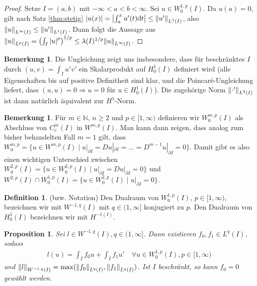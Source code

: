 \documentclass[twoside]{article}
\newtheorem{proposition}[theorem]{Proposition}
\theoremstyle{definition}
\newtheorem{remark}[theorem]{Bemerkung}
\newtheorem{definition}[theorem]{Definition}
\begin{document}
\begin{proof}
Setze $I = (a,b)$ mit $-\infty < a < b < \infty$. Sei $u \in W^{1,p}_0(I)$. Da $u(a) = 0$, gilt nach Satz \ref{thm:stetig} $\abs{u(x)} = \abs{\int_a^x u'(t) \mathrm{d}t}\leq \norm{u'}_{L^1(I)}$, also $\norm{u}_{L^\infty(I)} \leq \norm{u'}_{L^1(I)}$. Dann folgt die Aussage aus $\norm{u}_{L^p(I)} = \left(\int_I \abs{u}^p \right)^{1/p} \leq \lambda(I)^{1/p} \norm{u}_{L^\infty(I)}$.
\end{proof}
\begin{remark}
Die Ungleichung zeigt uns insbesondere, dass für beschränktes $I$ durch $(u,v)= \int_I u'v'$ ein Skalarprodukt auf $H^1_0(I)$ definiert wird (alle Eigenschaften bis auf positive Definitheit sind klar, und die Poincar{\'e}-Ungleichung liefert, dass $(u,u)=0 \Rightarrow u = 0$ für $u \in H^1_0(I)$). Die zugehörige Norm $\norm{\cdot'}_{L^2(I)}$ ist dann natürlich äquivalent zur $H^1$-Norm.
\end{remark}
\begin{remark}
Für $m \in \mathbb{N}$, $n \geq 2$ und $p \in [1,\infty)$ definieren wir $W^{m,p}_0(I)$ als Abschluss von $C_c^m(I)$ in $W^{m,p}(I)$. Man kann dann zeigen, dass analog zum bisher behandelten Fall $m=1$ gilt, dass $W_0^{m,p}= \{u \in W^{m,p}(I)  \; | \; u|_{\partial I} = D u|_{\partial I} = \dots = D^{m-1}u|_{\partial I} = 0\}$. Damit gibt es also einen wichtigen Unterschied zwischen $W^{2,p}_0(I)=\{u \in W^{2,p}_0(I) \; | \;   u|_{\partial I} = D u|_{\partial I} =0 \}$ und $W^{2,p}(I) \cap W^{1,p}_0(I) = \{u \in W^{2,p}_0(I) \; | \;   u|_{\partial I} = 0 \}$.
\end{remark}
\begin{definition} 
(bzw. Notation) Den Dualraum von $W^{1,p}_0(I)$, $p \in [1,\infty)$, bezeichnen wir mit $W^{-1,q}(I)$ mit $q \in (1,\infty]$ konjugiert zu $p$. Den Dualraum von $H^1_0(I)$ bezeichnen wir mit $H^{-1(I)}$.
\end{definition}
\begin{proposition}
Sei $l \in W^{-1,q}(I), q \in (1,\infty]$. Dann existieren $f_0,f_1 \in L^{q}(I)$, sodass
\begin{align*}
l(u) = \int_I f_0 u  + \int_I f_1 u' \quad \forall u \in W^{1,p}_0(I), p \in [1,\infty)
\end{align*}
und $\norm{l}_{ W^{-1,q}(I)}=\max(\norm{f_0}_{L^q(I)},\norm{f_1}_{L^q(I)})$. Ist $I$ beschränkt, so kann $f_0=0$ gewählt werden.
\end{proposition}
\end{document}
